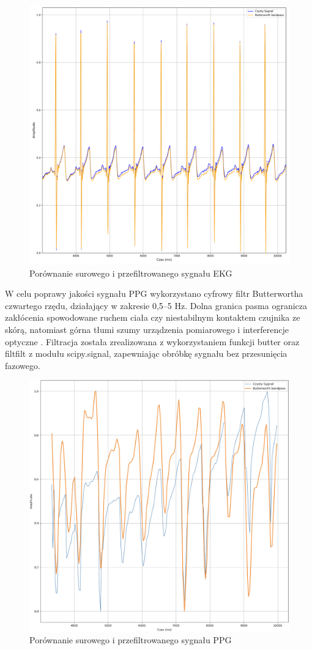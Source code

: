 \documentclass[journal]{IEEEtran}
\begin{document}
\begin{figure}[htbp]
    \centering
    \includegraphics[width=0.76\linewidth]{Filtr_EKG.png} 
    \caption{Porównanie surowego i przefiltrowanego sygnału EKG}
    \label{fig:filtr_ekg}
\end{figure}

W celu poprawy jakości sygnału PPG wykorzystano cyfrowy filtr Butterwortha czwartego rzędu, działający w zakresie 0,5–5 Hz. Dolna granica pasma ogranicza zakłócenia spowodowane ruchem ciała czy niestabilnym kontaktem czujnika ze skórą, natomiast górna tłumi szumy urządzenia pomiarowego i interferencje optyczne  \cite{9}. Filtracja została zrealizowana z wykorzystaniem funkcji butter oraz filtfilt z modułu scipy.signal, zapewniając obróbkę sygnału bez przesunięcia fazowego.

\begin{figure}[htbp]
    \centering
    \includegraphics[width=0.76\linewidth]{Filtr_PPG.png} 
    \caption{Porównanie surowego i przefiltrowanego sygnału PPG}
    \label{fig:filtr_ppg}
\end{figure}
\end{document}
